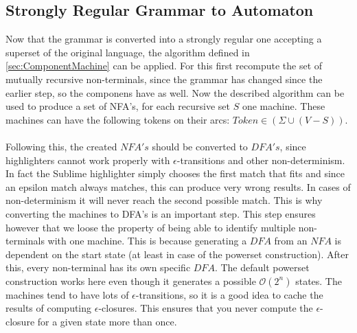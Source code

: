 	\subsection{Strongly Regular Grammar to Automaton}
	Now that the grammar is converted into a strongly regular one accepting a superset of the original language, the algorithm defined in \ref{sec:ComponentMachine} can be applied. For this first recompute the set of mutually recursive non-terminals, since the grammar has changed since the earlier step, so the componens have as well. Now the described algorithm can be used to produce a set of NFA's, for each recursive set $S$ one machine. These machines can have the following tokens on their arcs: $Token \in (\Sigma \cup (V - S))$.\\\\
	Following this, the created $NFA's$ should be converted to $DFA's$, since highlighters cannot work properly with $\epsilon$-transitions and other non-determinism. In fact the Sublime highlighter simply chooses the first match that fits and since an epsilon match always matches, this can produce very wrong results. In cases of non-determinism it will never reach the second possible match. This is why converting the machines to DFA's is an important step. This step ensures however that we loose the property of being able to identify multiple non-terminals with one machine. This is because generating a $DFA$ from an $NFA$ is dependent on the start state (at least in case of the powerset construction). After this, every non-terminal has its own specific $DFA$. The default powerset construction works here even though it generates a possible $\mathcal{O}(2^n)$ states. The machines tend to have lots of $\epsilon$-transitions, so it is a good idea to cache the results of computing $\epsilon$-closures. This ensures that you never compute the $\epsilon$-closure for a given state more than once.
	
